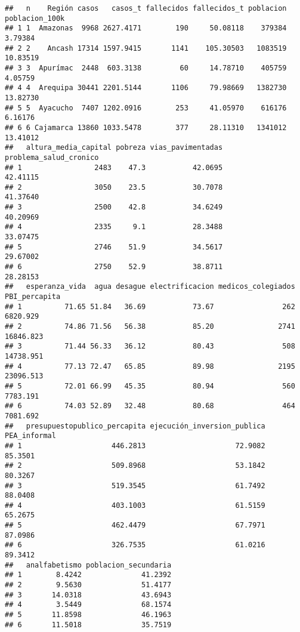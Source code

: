 \documentclass[
]{article}
\begin{document}
\begin{verbatim}
##   n    Región casos   casos_t fallecidos fallecidos_t poblacion poblacion_100k
## 1 1  Amazonas  9968 2627.4171        190     50.08118    379384        3.79384
## 2 2    Ancash 17314 1597.9415       1141    105.30503   1083519       10.83519
## 3 3  Apurímac  2448  603.3138         60     14.78710    405759        4.05759
## 4 4  Arequipa 30441 2201.5144       1106     79.98669   1382730       13.82730
## 5 5  Ayacucho  7407 1202.0916        253     41.05970    616176        6.16176
## 6 6 Cajamarca 13860 1033.5478        377     28.11310   1341012       13.41012
##   altura_media_capital pobreza vias_pavimentadas problema_salud_cronico
## 1                 2483    47.3           42.0695               42.41115
## 2                 3050    23.5           30.7078               41.37640
## 3                 2500    42.8           34.6249               40.20969
## 4                 2335     9.1           28.3488               33.07475
## 5                 2746    51.9           34.5617               29.67002
## 6                 2750    52.9           38.8711               28.28153
##   esperanza_vida  agua desague electrificacion medicos_colegiados PBI_percapita
## 1          71.65 51.84   36.69           73.67                262      6820.929
## 2          74.86 71.56   56.38           85.20               2741     16846.823
## 3          71.44 56.33   36.12           80.43                508     14738.951
## 4          77.13 72.47   65.85           89.98               2195     23096.513
## 5          72.01 66.99   45.35           80.94                560      7783.191
## 6          74.03 52.89   32.48           80.68                464      7081.692
##   presupuestopublico_percapita ejecución_inversion_publica PEA_informal
## 1                     446.2813                     72.9082      85.3501
## 2                     509.8968                     53.1842      80.3267
## 3                     519.3545                     61.7492      88.0408
## 4                     403.1003                     61.5159      65.2675
## 5                     462.4479                     67.7971      87.0986
## 6                     326.7535                     61.0216      89.3412
##   analfabetismo poblacion_secundaria
## 1        8.4242              41.2392
## 2        9.5630              51.4177
## 3       14.0318              43.6943
## 4        3.5449              68.1574
## 5       11.8598              46.1963
## 6       11.5018              35.7519
\end{verbatim}
\end{document}
